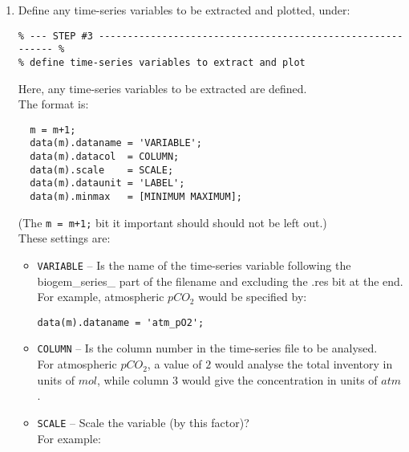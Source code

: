 \begin{enumerate}
\vspace{2mm}
\item Define any time-series variables to be extracted and plotted, under:
\vspace{-1mm}\small\begin{verbatim}
% --- STEP #3 ----------------------------------------------------------- %
% define time-series variables to extract and plot
\end{verbatim}\normalsize\vspace{-1mm}
Here, any time-series variables to be extracted are defined.
\\The format is:
\vspace{-1mm}\small\begin{verbatim}
  m = m+1;
  data(m).dataname = 'VARIABLE';
  data(m).datacol  = COLUMN;
  data(m).scale    = SCALE;
  data(m).dataunit = 'LABEL';
  data(m).minmax   = [MINIMUM MAXIMUM];
\end{verbatim}\normalsize\vspace{-1mm}
(The \texttt{m = m+1;} bit it important should should not be left out.)
\\These settings are:
\begin{itemize}[noitemsep]
\vspace{1mm}
\item \texttt{VARIABLE} -- Is the name of the time-series variable following the \textsf{\small biogem\_series\_} part of the filename and excluding the \textsf{\small .res} bit at the end. 
\\For example, atmospheric \(pCO_{2}\) would be specified by:
\vspace{-1mm}\small\begin{verbatim}
data(m).dataname = 'atm_pO2';
\end{verbatim}\normalsize\vspace{-1mm}
\vspace{1mm}
\item \texttt{COLUMN} -- Is the column number in the time-series file to be analysed. 
\\For atmospheric \(pCO_{2}\), a value of \(2\) would analyse the total inventory in units of \(mol\), while column \(3\) would give the concentration in units of \(atm\).
\vspace{1mm}
\item \texttt{SCALE} -- Scale the variable (by this factor)?
\\For example:
\vspace{-1mm}\small\begin{verbatim}

\end{verbatim}
\end{itemize}
\end{enumerate}
